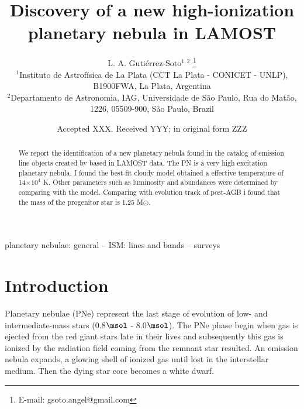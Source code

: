 \documentclass[fleqn,usenatbib]{mnras}
\title[New high-ionization planetary nebula]{Discovery of a new high-ionization planetary nebula in LAMOST}
\author[Guti\'errez-Soto et al.]{
  L. A. Guti\'errez-Soto$^{1,2}$
  \thanks{E-mail: gsoto.angel@gmail.com}
\\
$^{1}$Instituto de Astrof\'{i}sica de La Plata (CCT La Plata - CONICET - UNLP), B1900FWA, La Plata, Argentina\\
$^{2}$Departamento de Astronomia, IAG, Universidade de S\~{a}o Paulo, Rua do Mat\~{a}o, 1226, 05509-900, S\~{a}o Paulo, Brazil\\
}
\date{Accepted XXX. Received YYY; in original form ZZZ}
\begin{document}
\label{firstpage}
\pagerange{\pageref{firstpage}--\pageref{lastpage}}
\maketitle

\begin{abstract}
  We report the identification of a new planetary nebula found in the catalog of
  emission line objects created by \citet{Skoda:2020} based in LAMOST data. The PN is a very
  high excitation planetary nebula. I found the best-fit {\sc cloudy} model obtained a
  effective temperature of 14$\times10^{4}$ K. Other parameters such as luminosity
  and abundances were determined by comparing with the model.
  Comparing with evolution track of post-AGB i found that the mass
  of the progenitor star is 1.25 M{$\odot$}. 
\end{abstract}

\begin{keywords}
planetary nebulae: general -- ISM: lines and bands -- surveys
\end{keywords}



\section{Introduction}

\label{sec:intro}

Planetary nebulae (PNe) represent the last stage of evolution of low- and intermediate-mass stars
(0.8$\msol$ - 8.0$\msol$). The PNe phase begin when gas is ejected from the red giant stars late
in their lives and subsequently this gas is ionized by the radiation field coming from the remnant
star resulted. An emission nebula expands, a glowing shell of ionized gas until lost in the
interstellar medium. Then the dying star core becomes a white dwarf.
\end{document}
